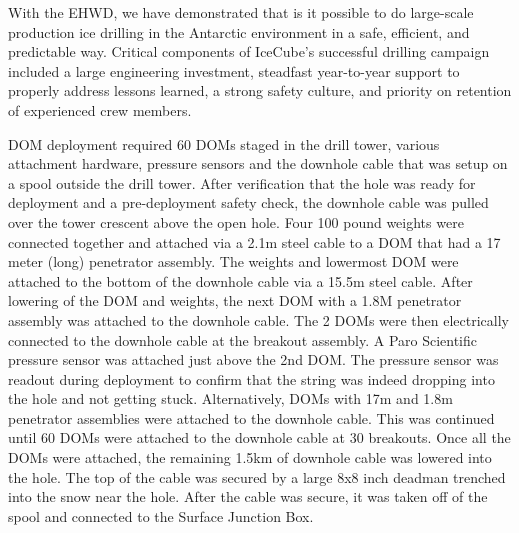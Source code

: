 With the EHWD, we have demonstrated that is it possible to do large-scale production ice drilling in the Antarctic environment in a safe, efficient, and predictable way.  Critical components of IceCube’s successful drilling campaign included a large engineering investment, steadfast year-to-year support to properly address lessons learned, a strong safety culture, and priority on retention of experienced crew members.

DOM deployment required 60 DOMs staged in the drill tower, various attachment hardware, pressure sensors and the downhole cable that was setup on a spool outside the drill tower. After verification that the hole was ready for deployment and a pre-deployment safety check, the downhole cable was pulled over the tower crescent above the open hole. Four 100 pound weights were connected together and attached via a 2.1m steel cable to a DOM that had a 17 meter (long) penetrator assembly. The weights and lowermost DOM were attached to the bottom of the downhole cable via a 15.5m steel cable. After lowering of the DOM and weights, the next DOM with a 1.8M penetrator assembly was attached to the downhole cable. The 2 DOMs were then electrically connected to the downhole cable at the breakout assembly. A Paro Scientific pressure sensor was attached just above the 2nd DOM. The pressure sensor was readout during deployment to confirm that the string was indeed dropping into the hole and not getting stuck. Alternatively, DOMs with 17m and 1.8m penetrator assemblies were attached to the downhole cable. This was continued until 60 DOMs were attached to the downhole cable at 30 breakouts. Once all the DOMs were attached, the remaining 1.5km of downhole cable was lowered into the hole. The top of the cable was secured by a large 8x8 inch deadman trenched into the snow near the hole. After the cable was secure, it was taken off of the spool and connected to the Surface Junction Box.

